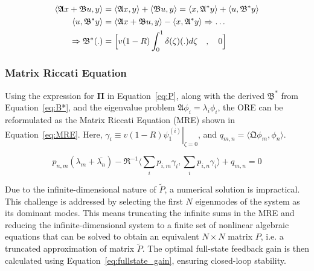 \begin{equation} \label{eq:B*}
    \begin{aligned}
        \langle \mathfrak{A} x + \mathfrak{B} u, y \rangle
        &= \langle \mathfrak{A} x, y \rangle
        + \langle \mathfrak{B} u, y \rangle
        = \langle x, \mathfrak{A}^* y\rangle
        + \langle u, \mathfrak{B}^* y \rangle \\
        \langle u, \mathfrak{B}^* y \rangle
        &= \langle \mathfrak{A} x + \mathfrak{B} u, y \rangle
        - \langle x, \mathfrak{A}^* y\rangle
        \Rightarrow \hdots \\ \Rightarrow \mathfrak{B}^* (.) &= \Bigl[ v(1-R) \int_0^1 \delta(\zeta) (.) d\zeta \quad , \quad 0 \Bigr]
    \end{aligned}
\end{equation}

\subsubsection{Matrix Riccati Equation}

Using the expression for $\mathbf{\Pi}$ in Equation~\ref{eq:P}, along with the derived $\mathfrak{B}^*$ from Equation~\ref{eq:B*}, and the eigenvalue problem $\mathfrak{A}\phi_i = \lambda_i \phi_i$, the ORE can be reformulated as the Matrix Riccati Equation (MRE) shown in Equation~\ref{eq:MRE}. Here, $\gamma_i \equiv v(1-R) \left. \psi_{1}^{(i)} \right|_{\zeta = 0}$, and $q_{m,n} = \langle \mathfrak{Q} \phi_m, \phi_n \rangle$.

\begin{equation}\label{eq:MRE}
    p_{n,m} (\lambda_m + \overline{\lambda_n})
    - \mathfrak{R}^{-1} \langle \sum_i p_{i,m} \gamma_i, \sum_i p_{i,n} \gamma_i \rangle
    + q_{m,n} = 0
\end{equation}

Due to the infinite-dimensional nature of $\tilde{P}$, a numerical solution is impractical. This challenge is addressed by selecting the first $N$ eigenmodes of the system as its dominant modes. This means truncating the infinite sums in the MRE and reducing the infinite-dimensional system to a finite set of nonlinear algebraic equations that can be solved to obtain an equivalent $N \times N$ matrix $P$, i.e. a truncated approximation of matrix $\tilde{P}$. The optimal full-state feedback gain is then calculated using Equation~\ref{eq:fullstate_gain}, ensuring closed-loop stability.

